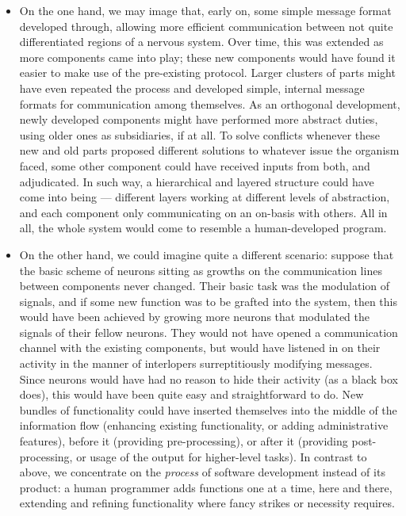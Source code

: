 \begin{itemize}
	\item On the one hand, we may image that, early on, some simple message format developed through, allowing more efficient communication between not quite differentiated regions of a nervous system. Over time, this was extended as more components came into play; these new components would have found it easier to make use of the pre-existing protocol. Larger clusters of parts might have even repeated the process and developed simple, internal message formats for communication among themselves. As an orthogonal development, newly developed components might have performed more abstract duties, using older ones as subsidiaries, if at all. To solve conflicts whenever these new and old parts proposed different solutions to whatever issue the organism faced, some other component could have received inputs from both, and adjudicated. In such way, a hierarchical and layered structure could have come into being --- different layers working at different levels of abstraction, and each component only communicating on an on-basis with others. All in all, the whole system would come to resemble a human-developed program.
	
	\item On the other hand, we could imagine quite a different scenario: suppose that the basic scheme of neurons sitting as growths on the communication lines between components never changed. Their basic task was the modulation of signals, and if some new function was to be grafted into the system, then this would have been achieved by growing more neurons that modulated the signals of their fellow neurons. They would not have opened a communication channel with the existing components, but would have listened in on their activity in the manner of interlopers surreptitiously modifying messages. Since neurons would have had no reason to hide their activity (as a black box does), this would have been quite easy and straightforward to do. New bundles of functionality could have inserted themselves into the middle of the information flow (enhancing existing functionality, or adding administrative features), before it (providing pre-processing), or after it (providing post-processing, or usage of the output for higher-level tasks). In contrast to above, we concentrate on the {\em process} of software development instead of its product: a human programmer adds functions one at a time, here and there, extending and refining functionality where fancy strikes or necessity requires.
\end{itemize}

